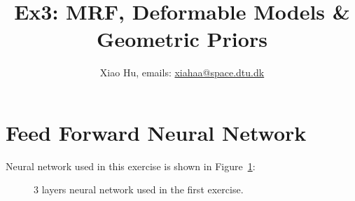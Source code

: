 \documentclass[a4paper]{article}
\title{Ex3: MRF, Deformable Models \& Geometric Priors}
\author{Xiao Hu, emails: \url{xiahaa@space.dtu.dk}}
\begin{document}
	\maketitle
	\thispagestyle{empty}
	\section{Feed Forward Neural Network}
	Neural network used in this exercise is shown in Figure~\ref{fig1}:
	\begin{figure}[thtbp]
	\setlength{\fboxrule}{0.0pt}      
	\label{fig1}
	\caption{$3$ layers neural network used in the first exercise.}
\end{figure}
\end{document}
